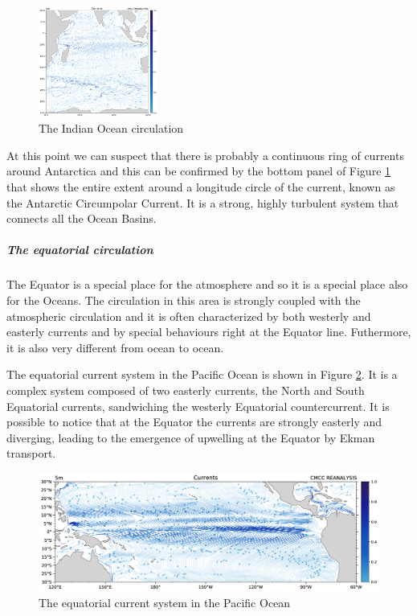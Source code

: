 \begin{figure}[htpb]
\centering
\includegraphics[width = 0.35\textwidth]{uploads/38image.png}
\caption{The Indian Ocean circulation} \label{fig:fig13}
\end{figure}

At this point we can suspect that there is probably a continuous ring of currents around Antarctica and this can be confirmed by the bottom panel of Figure \ref{fig:fig13}  that shows the entire extent around a
longitude circle of the current, known as the Antarctic Circumpolar
Current. It is a strong, highly turbulent system that connects all the
Ocean Basins.
\\

\subparagraph{The equatorial
circulation}

The Equator is a special place for the atmosphere and so it is a special
place also for the Oceans. The circulation in this area is strongly
coupled with the atmospheric circulation and it is often characterized
by both westerly and easterly currents and by special behaviours right
at the Equator line. Futhermore, it is also very different from ocean to
ocean.

The equatorial current system in the Pacific Ocean is shown in Figure \ref{fig:fig14}. It is a complex system composed of two easterly
currents, the North and South Equatorial currents, sandwiching the
westerly Equatorial countercurrent. It is possible to notice that at the
Equator the currents are strongly easterly and diverging, leading to the
emergence of upwelling at the Equator by Ekman transport.

\begin{figure}[htpb]
\centering
\includegraphics[width = 0.4 \textwidth]{uploads/39image.png}
\caption{The equatorial current system in the Pacific Ocean} \label{fig:fig14}
\end{figure}

